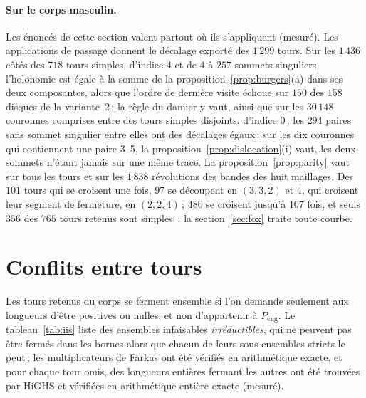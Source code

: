 \documentclass[11pt,a4paper]{article}
\begin{document}
\paragraph{Sur le corps masculin.}
Les énoncés de cette section valent partout où ils s'appliquent (mesuré). Les
applications de passage donnent le décalage exporté des $1\,299$ tours. Sur
les $1\,436$ côtés des $718$ tours simples, d'indice $4$ et de $4$ à $257$
sommets singuliers, l'holonomie est égale à la somme de la
proposition~\ref{prop:burgers}(a) dans ses deux composantes, alors que l'ordre
de dernière visite échoue sur $150$ des $158$ disques de la variante~2\,; la
règle du damier y vaut, ainsi que sur les $30\,148$ couronnes comprises entre
des tours simples disjoints, d'indice $0$\,; les $294$ paires sans sommet
singulier entre elles ont des décalages égaux\,; sur les dix couronnes qui
contiennent une paire 3--5, la proposition~\ref{prop:dislocation}(i) vaut, les
deux sommets n'étant jamais sur une même trace. La
proposition~\ref{prop:parity} vaut sur tous les tours et sur les $1\,838$
révolutions des bandes des huit maillages. Des $101$ tours qui se croisent une
fois, $97$ se découpent en $(3, 3, 2)$ et $4$, qui croisent leur segment de
fermeture, en $(2, 2, 4)$\,; $480$ se croisent jusqu'à $107$ fois, et seuls
$356$ des $765$ tours retenus sont simples~: la section~\ref{sec:fox} traite
toute courbe.

\section{Conflits entre tours}\label{sec:conflicts}

Les tours retenus du corps se ferment ensemble si l'on demande seulement aux
longueurs d'être positives ou nulles, et non d'appartenir à
$P_{\mathrm{eng}}$. Le tableau~\ref{tab:iis} liste des ensembles infaisables
\emph{irréductibles}, qui ne peuvent pas être fermés dans les bornes alors
que chacun de leurs sous-ensembles stricts le peut\,; les multiplicateurs de
Farkas ont été vérifiés en arithmétique exacte, et pour chaque tour omis, des
longueurs entières fermant les autres ont été trouvées par HiGHS et vérifiées
en arithmétique entière exacte (mesuré).
\end{document}
